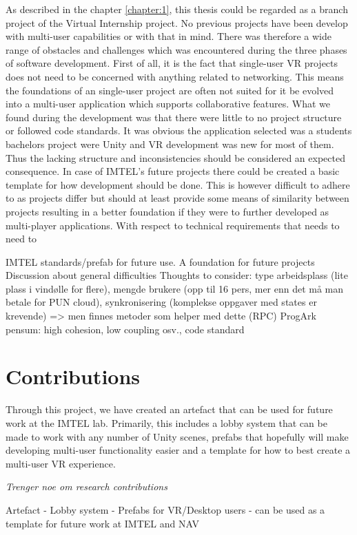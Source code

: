 As described in the chapter \ref{chapter:1}, this thesis could be regarded as a branch project of the Virtual Internship project. No previous projects have been develop with multi-user capabilities or with that in mind. There was therefore a wide range of obstacles and challenges which was encountered during the three phases of software development. First of all, it is the fact that single-user VR projects does not need to be concerned with anything related to networking. This means the foundations of an single-user project are often not suited for it be evolved into a multi-user application which supports collaborative features. What we found during the development was that there were little to no project structure or followed code standards. It was obvious the application selected was a students bachelors project were Unity and VR development was new for most of them. Thus the lacking structure and inconsistencies should be considered an expected consequence. In case of IMTEL's future projects there could be created a basic template for how development should be done. This is however difficult to adhere to as projects differ but should at least provide some means of similarity between projects resulting in a better foundation if they were to further developed as multi-player applications.    
With respect to technical requirements that needs to need to 


IMTEL standards/prefab for future use. A foundation for future projects
Discussion about general difficulties
Thoughts to consider: type arbeidsplass (lite plass i vindølle for flere), mengde brukere (opp til 16 pers, mer enn det må man betale for PUN cloud), synkronisering (komplekse oppgaver med states er krevende) => men finnes metoder som helper med dette (RPC)
ProgArk pensum: high cohesion, low coupling osv., code standard


\section{Contributions}
Through this project, we have created an artefact that can be used for future work at the IMTEL lab. Primarily, this includes a lobby system that can be made to work with any number of Unity scenes, prefabs that hopefully will make developing multi-user functionality easier and a template for how to best create a multi-user VR experience. 

\textit{Trenger noe om research contributions}

Artefact
- Lobby system
- Prefabs for VR/Desktop users
- can be used as a template for future work at IMTEL and NAV

